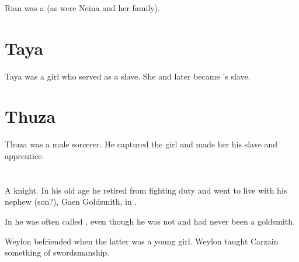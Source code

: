 \subsubsection{\Tulan}
Rian was a  (as were Neina and her family).















\section{Taya}
Taya was a \human girl who served  as a slave.
She  and later became \Shachar's slave. 















\section{Thuza}
Thuza was a male \human sorcerer. 
He captured the girl  and made her his slave and apprentice.















\section[Weylon]{\Rah{\Weylon}}
\index{\rah[\Weylon]}
A  knight.
In his old age he retired from fighting duty and went to live with his nephew (son?), Gaen Goldsmith, in . 

In \Redglen{} he was often called , even though he was not and had never been a goldsmith. 

Weylon befriended  when the latter was a young girl.
Weylon taught Carzain something of swordsmanship. 















